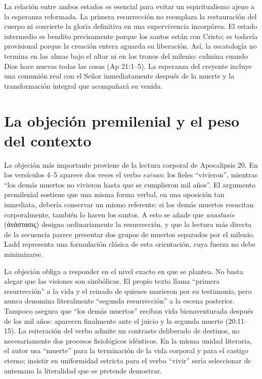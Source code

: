 La relación entre ambos estados es esencial para evitar un espiritualismo ajeno a la esperanza reformada.
La primera resurrección no reemplaza la restauración del cuerpo ni convierte la gloria definitiva en una supervivencia incorpórea.
El estado intermedio es bendito precisamente porque los santos están con Cristo; es todavía provisional porque la creación entera aguarda su liberación.
Así, la escatología no termina en las almas bajo el altar ni en los tronos del milenio: culmina cuando Dios hace nuevas todas las cosas (Ap 21:1--5).
La esperanza del creyente incluye una comunión real con el Señor inmediatamente después de la muerte y la transformación integral que acompañará su venida.

\section{La objeción premilenial y el peso del contexto}

La objeción más importante proviene de la lectura corporal de Apocalipsis 20.
En los versículos 4--5 aparece dos veces el verbo \emph{ezēsan}: los fieles \enquote{vivieron}, mientras \enquote{los demás muertos no vivieron hasta que se cumplieron mil años}.
El argumento premilenial sostiene que una misma forma verbal, en una oposición tan inmediata, debería conservar un mismo referente: si los demás muertos resucitan corporalmente, también lo hacen los santos.
A esto se añade que \emph{anastasis} (ἀνάστασις) designa ordinariamente la resurrección, y que la lectura más directa de la secuencia parece presentar dos grupos de muertos separados por el milenio.
Ladd representa una formulación clásica de esta orientación, cuya fuerza no debe minimizarse. \autocite{ladd1972}

La objeción obliga a responder en el nivel exacto en que se plantea.
No basta alegar que las visiones son simbólicas.
El propio texto llama \enquote{primera resurrección} a la vida y el reinado de quienes murieron por su testimonio, pero nunca denomina literalmente \enquote{segunda resurrección} a la escena posterior.
Tampoco asegura que \enquote{los demás muertos} reciban vida bienaventurada después de los mil años: aparecen finalmente ante el juicio y la segunda muerte (20:11--15).
La reiteración del verbo admite un contraste deliberado de destinos, no necesariamente dos procesos fisiológicos idénticos.
En la misma unidad literaria, el autor usa \enquote{muerte} para la terminación de la vida corporal y para el castigo eterno; insistir en uniformidad estricta para el verbo \enquote{vivir} sería seleccionar de antemano la literalidad que se pretende demostrar.

